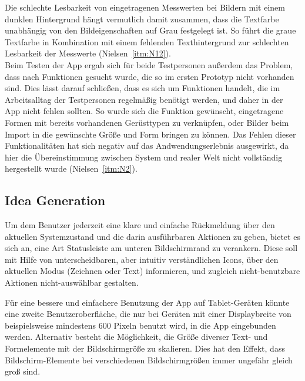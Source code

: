 Die schlechte Lesbarkeit von eingetragenen Messwerten bei Bildern mit einem dunklen Hintergrund hängt vermutlich damit zusammen, dass die Textfarbe unabhängig von den Bildeigenschaften auf Grau festgelegt ist.
So führt die graue Textfarbe in Kombination mit einem fehlenden Texthintergrund zur schlechten Lesbarkeit der Messwerte (Nielsen~\autoref{itm:N12}). \\

Beim Testen der App ergab sich für beide Testpersonen außerdem das Problem, dass nach Funktionen gesucht wurde, die so im ersten Prototyp nicht vorhanden sind.
Dies lässt darauf schließen, dass es sich um Funktionen handelt, die im Arbeitsalltag der Testpersonen regelmäßig benötigt werden, und daher in der App nicht fehlen sollten.
So wurde sich die Funktion gewünscht, eingetragene Formen mit bereits vorhandenen Gerüsttypen zu verknüpfen, oder Bilder beim Import in die gewünschte Größe und Form bringen zu können.
Das Fehlen dieser Funktionalitäten hat sich negativ auf das Andwendungserlebnis ausgewirkt, da hier die Übereinstimmung zwischen System und realer Welt nicht vollständig hergestellt wurde (Nielsen~\autoref{itm:N2}).

\subsection{Idea Generation}\label{subsec:idea2}
Um dem Benutzer jederzeit eine klare und einfache Rückmeldung über den aktuellen Systemzustand und die darin ausführbaren Aktionen zu geben, bietet es sich an, eine Art Statusleiste am unteren Bildschirmrand zu verankern.
Diese soll mit Hilfe von unterscheidbaren, aber intuitiv verständlichen Icons, über den aktuellen Modus (Zeichnen oder Text) informieren, und zugleich nicht-benutzbare Aktionen nicht-auswählbar gestalten. \\

Für eine bessere und einfachere Benutzung der App auf Tablet-Geräten könnte eine zweite Benutzeroberfläche, die nur bei Geräten mit einer Displaybreite von beispielsweise mindestens $600$ Pixeln benutzt wird, in die App eingebunden werden. 
Alternativ besteht die Möglichkeit, die Größe diverser Text- und Formelemente mit der Bildschirmgröße zu skalieren.
Dies hat den Effekt, dass Bildschirm-Elemente bei verschiedenen Bildschirmgrößen immer ungefähr gleich groß sind.
\\


